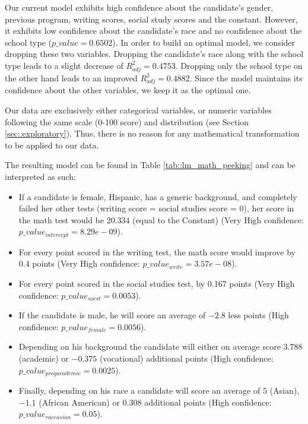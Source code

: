 \documentclass[10pt, a4paper]{article}
\begin{document}
	Our current model exhibits high confidence about the candidate's gender, previous program, writing scores, social study scores and the constant. However, it exhibits low confidence about the candidate's race and no confidence about the school type ($p\_value=0.6502$). In order to build an optimal model, we consider dropping these two variables. Dropping the candidate's race along with the school type leads to a slight decrease of $R^2_{adj} = 0.4753$. Dropping only the school type on the other hand leads to an improved $R^2_{adj} = 0.4882$. Since the model maintains its confidence about the other variables, we keep it as the optimal one.
	
	Our data are exclusively either categorical variables, or numeric variables following the same scale (0-100 score) and distribution (see Section \ref{sec::exploratory}). Thus, there is no reason for any mathematical transformation to be applied to our data.
	
	
	
	The resulting model can be found in Table \ref{tab::lm_math_peeking} and can be interpreted as such: 
	\begin{itemize}
		\item If a candidate is female, Hispanic, has a generic background, and completely failed her other tests (writing score = social studies score = 0), her score in the math test would be $20.334$ (equal to the Constant) (Very High confidence: $p\_value_{intercept} = 8.29e-09$). 
		\item For every point scored in the writing test, the math score would improve by 0.4 points (Very High confidence: $p\_value_{write} = 3.57e-08$).
		\item For every point scored in the social studies test, by 0.167 points (Very High confidence: $p\_value_{socst} = 0.0053$).
		\item If the candidate is male, he will score an average of $-2.8$ less points (High confidence: $p\_value_{female} = 0.0056$).
		\item Depending on his background the candidate will either on average score $3.788$ (academic) or $-0.375$ (vocational) additional points (High confidence: $p\_value_{progacademic} = 0.0025$).
		\item Finally, depending on his race a candidate will score an average of $5$ (Asian), $-1.1$ (African American) or $0.308$ additional points (High confidence: $p\_value_{raceasian} = 0.05$).
	\end{itemize}
\end{document}
